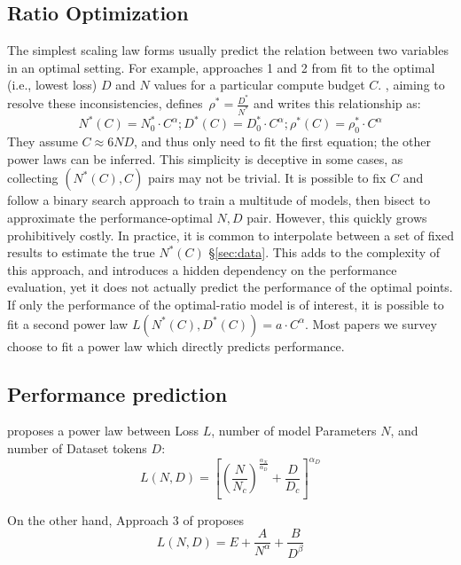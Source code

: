 \subsection{Ratio Optimization} \label{sec:ratio_opt}
The simplest scaling law forms usually predict the relation between two variables in an optimal setting. For example, approaches 1 and 2 from \citet{hoffmann2022training}
fit to the optimal (i.e., lowest loss) $D$ and $N$ values for a particular compute budget $C$. 
\citet{porian2024resolving}, aiming to resolve these inconsistencies, defines\ $\rho^* = \frac{D^*}{N^*}$ and writes this relationship as: 
\begin{equation}
    N^*(C) = N^*_0 \cdot C^{\alpha} ; D^*(C) = D^*_0 \cdot C^{\alpha}; \rho^*(C) = \rho^*_0 \cdot C^{\alpha}
\end{equation}
They assume $C \approx 6ND$, and thus only need to fit the first equation; the other power laws can be inferred. This simplicity is deceptive in some cases, as collecting $(N^*(C), C)$ pairs may not be trivial. It is possible to fix $C$ and follow a binary search approach to train a multitude of models, then bisect to approximate the performance-optimal $N,D$ pair. However, this quickly grows prohibitively costly. In practice, it is common to interpolate between a set of fixed results to estimate the true $N^*(C)$ {\S\ref{sec:data}}. This adds to the complexity of this approach, and introduces a hidden dependency on the performance evaluation, yet it does not actually predict the performance of the optimal points. 
If only the performance of the optimal-ratio model is of interest, it is possible to fit a second power law $L(N^*(C),  D^*(C)) = a \cdot C^\alpha$. Most papers we survey choose to fit a power law which directly predicts performance.


\subsection{Performance prediction}\label{sec:perf-pred}
\citet{kaplan2020scaling} proposes a power law between Loss $L$, number of model Parameters $N$, and number of Dataset tokens $D$: 
\begin{equation}
L(N, D) = \left[ \left( \frac{N}{N_c}\right)^{\frac{\alpha_N}{\alpha_D}} + \frac{D}{D_c} \right]^{\alpha_D}     
\end{equation}

On the other hand, Approach 3 of \citet{hoffmann2022training} proposes
\begin{equation}
    L(N, D) = E + \frac{A}{N^\alpha} + \frac{B}{D^\beta} 
\end{equation}

